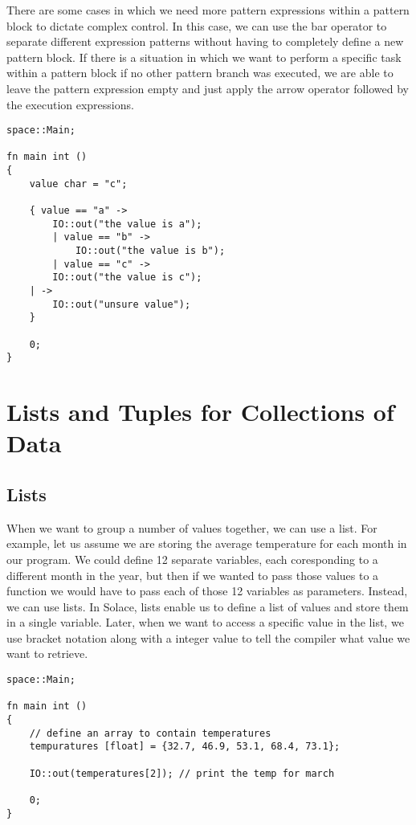 \documentclass{article}
\begin{document}
There are some cases in which we need more pattern expressions within a pattern block to dictate complex control. In this case, we can use the bar operator to separate different
expression patterns without having to completely define a new pattern block. If there is a situation in which we want to perform a specific task within a pattern block if no other
pattern branch was executed, we are able to leave the pattern expression empty and just apply the arrow operator followed by the execution expressions.

\begin{lstlisting}
space::Main;

fn main int ()
{
	value char = "c";

 	{ value == "a" ->
  		IO::out("the value is a");
    	| value == "b" ->
     		IO::out("the value is b");
        | value == "c" ->
		IO::out("the value is c");
  	| ->
   		IO::out("unsure value");
  	}

	0;
}
\end{lstlisting}


\section{Lists and Tuples for Collections of Data}

\subsection{Lists}

When we want to group a number of values together, we can use a list. For example, let us assume we are storing the average temperature for each month in our program.
We could define 12 separate variables, each coresponding to a different month in the year, but then if we wanted to pass those values to a function we would have to pass
each of those 12 variables as parameters. Instead, we can use lists. In Solace, lists enable us to define a list of values and store them in a single variable.
Later, when we want to access a specific value in the list, we use bracket notation along with a integer value to tell the compiler what value we want to retrieve.

\begin{lstlisting}
space::Main;

fn main int ()
{
	// define an array to contain temperatures
	tempuratures [float] = {32.7, 46.9, 53.1, 68.4, 73.1};

	IO::out(temperatures[2]); // print the temp for march

	0;
}
\end{lstlisting}
\end{document}
